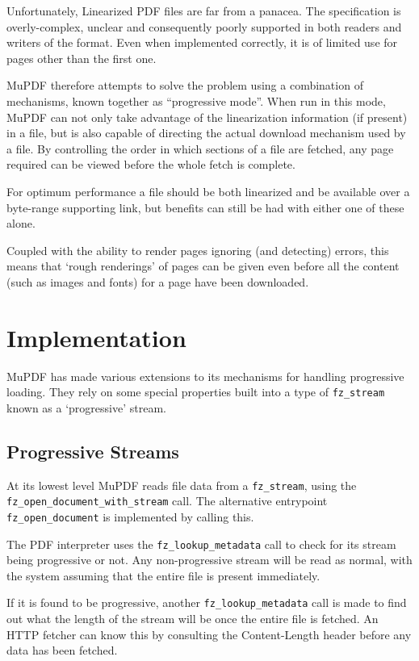 \documentclass[oneside]{book}
\begin{document}
Unfortunately, Linearized PDF files are far from a panacea. The specification is overly-complex, unclear and consequently poorly supported in both readers and writers of the format. Even when implemented correctly, it is of limited use for pages other than the first one.

MuPDF therefore attempts to solve the problem using a combination of mechanisms, known together as ``progressive mode''. When run in this mode, MuPDF can not only take advantage of the linearization information (if present) in a file, but is also capable of directing the actual download mechanism used by a file. By controlling the order in which sections of a file are fetched, any page required can be viewed before the whole fetch is complete.

For optimum performance a file should be both linearized and be
available over a byte-range supporting link, but benefits can still
be had with either one of these alone.

Coupled with the ability to render pages ignoring (and detecting) errors, this means that `rough renderings' of pages can be given even before all the content (such as images and fonts) for a page have been downloaded.

\section{Implementation}

MuPDF has made various extensions to its mechanisms for handling
progressive loading. They rely on some special properties built into a type of \texttt{fz\_stream} known as a `progressive' stream.

\subsection{Progressive Streams}

At its lowest level MuPDF reads file data from a \texttt{fz\_stream}, using the \texttt{fz\_open\_document\_with\_stream} call. The alternative entrypoint \texttt{fz\_open\_document} is implemented by calling this.

The PDF interpreter uses the \texttt{fz\_lookup\_metadata} call to check for its stream being progressive or not. Any non-progressive stream will be read as normal, with the system assuming that the entire file is present immediately.

If it is found to be progressive, another \texttt{fz\_lookup\_metadata} call is made to find out what the length of the stream will be once the  entire file is fetched. An HTTP fetcher can know this by consulting the Content-Length header before any data has been fetched.
\end{document}
